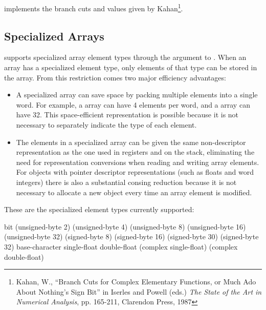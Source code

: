 \cmucl{} implements the branch cuts and values given by
Kahan\footnote{Kahan, W., ``Branch Cuts for Complex Elementary
Functions, or Much Ado About Nothing's Sign Bit''
in Iserles and Powell (eds.) \textit{The State of the Art
in Numerical Analysis}, pp. 165-211, Clarendon
Press, 1987}.
  


\subsection{Specialized Arrays}
\label{specialized-array-types}

\clisp{} supports specialized array element types through the
 argument to .  When an array has a
specialized element type, only elements of that type can be stored in
the array.  From this restriction comes two major efficiency
advantages:
\begin{itemize}
  
\item A specialized array can save space by packing multiple elements
  into a single word.  For example, a  array can have
  4 elements per word, and a  array can have 32.  This
  space-efficient representation is possible because it is not
  necessary to separately indicate the type of each element.
  
\item The elements in a specialized array can be given the same
  non-descriptor representation as the one used in registers and on
  the stack, eliminating the need for representation conversions when
  reading and writing array elements.  For objects with pointer
  descriptor representations (such as floats and word integers) there
  is also a substantial consing reduction because it is not necessary
  to allocate a new object every time an array element is modified.
\end{itemize}


These are the specialized element types currently supported:
\begin{lisp}
bit
(unsigned-byte 2)
(unsigned-byte 4)
(unsigned-byte 8)
(unsigned-byte 16)
(unsigned-byte 32)
(signed-byte 8)
(signed-byte 16)
(signed-byte 30)
(signed-byte 32)
base-character
single-float
double-float
(complex single-float)
(complex double-float)
\end{lisp}

